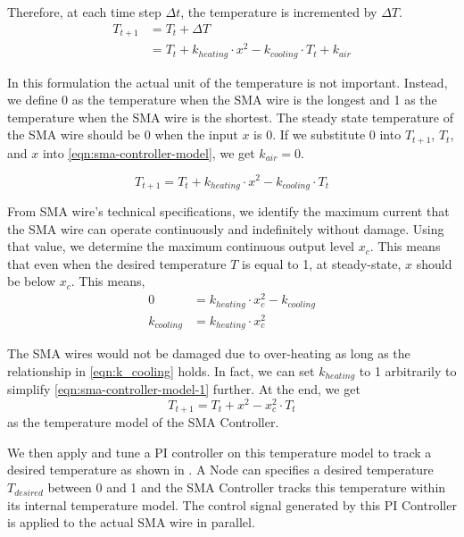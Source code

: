 Therefore, at each time step $\Delta t$, the temperature is incremented by $\Delta T$.  
\begin{subequations}
	\begin{flalign}
	T_{t+1} &=  T_{t} + \Delta T \\
		    &=  T_{t} + k_{heating} \cdot x^2 - k_{cooling} \cdot T_{t}  + k_{air}\label{eqn:sma-controller-model}
	\end{flalign}
\end{subequations}

In this formulation the actual unit of the temperature is not important. Instead, we define 0 as the temperature when the SMA wire is the longest and 1 as the temperature when the SMA wire is the shortest. The steady state temperature of the SMA wire should be 0 when the input $x$ is 0. If we substitute 0 into $T_{t+1}$, $T_{t}$, and $x$ into \eqref{eqn:sma-controller-model}, we get $k_{air} = 0$. 

\begin{equation}\label{eqn:sma-controller-model-1}
T_{t+1} =  T_{t} + k_{heating} \cdot x^2 - k_{cooling} \cdot T_{t}
\end{equation}

From SMA wire's technical specifications\cite{FlexinolTechSpecs}, we identify the maximum current that the SMA wire can operate continuously and indefinitely without damage. Using that value, we determine the maximum continuous output level $x_c$. This means that even when the desired temperature $T$ is equal to 1, at steady-state, $x$ should be below $x_c$. This means, 
\begin{subequations}
	\begin{flalign}
	 0 &= k_{heating} \cdot x_c^2 - k_{cooling} \\
	 k_{cooling} &=  k_{heating} \cdot x_c^2\label{eqn:k_cooling}
	\end{flalign}
\end{subequations}

The SMA wires would not be damaged due to over-heating as long as the relationship in \eqref{eqn:k_cooling} holds. In fact, we can set $k_{heating}$ to 1 arbitrarily to simplify \eqref{eqn:sma-controller-model-1} further. At the end, we get
\begin{equation}\label{eqn:sma-controller-model-2}
	T_{t+1} =  T_{t} + x^2 -  x_c^2 \cdot T_{t}
\end{equation}
as the temperature model of the SMA Controller.

We then apply and tune a PI controller on this temperature model to track a desired temperature as shown in . A Node can specifies a desired temperature $T_{desired}$ between 0 and 1 and the SMA Controller tracks this temperature within its internal temperature model. The control signal generated by this PI Controller is applied to the actual SMA wire in parallel. 

